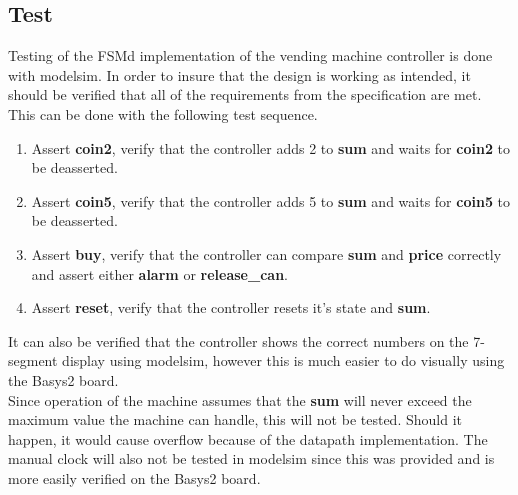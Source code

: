 \subsection{Test}
Testing of the FSMd implementation of the vending machine controller is done with modelsim.
In order to insure that the design is working as intended, it should be verified that
all of the requirements from the specification are met. 
This can be done with the following test sequence.
\begin{enumerate}
    \item Assert \textbf{coin2}, verify that the controller adds 2 to \textbf{sum} and waits for \textbf{coin2} to be deasserted.
    \item Assert \textbf{coin5}, verify that the controller adds 5 to \textbf{sum} and waits for \textbf{coin5} to be deasserted.
    \item Assert \textbf{buy}, verify that the controller can compare \textbf{sum} and \textbf{price} correctly and assert either \textbf{alarm} or \textbf{release\_can}.
    \item Assert \textbf{reset}, verify that the controller resets it's state and \textbf{sum}.
\end{enumerate}
It can also be verified that the controller shows the correct numbers on the 7-segment display using modelsim, however this is much easier to do 
visually using the Basys2 board. \\

Since operation of the machine assumes that the \textbf{sum} will never exceed the maximum value the machine can handle, this will not be tested.
Should it happen, it would cause overflow because of the datapath implementation.
The manual clock will also not be tested in modelsim since this was provided and is more easily verified on the Basys2 board.
